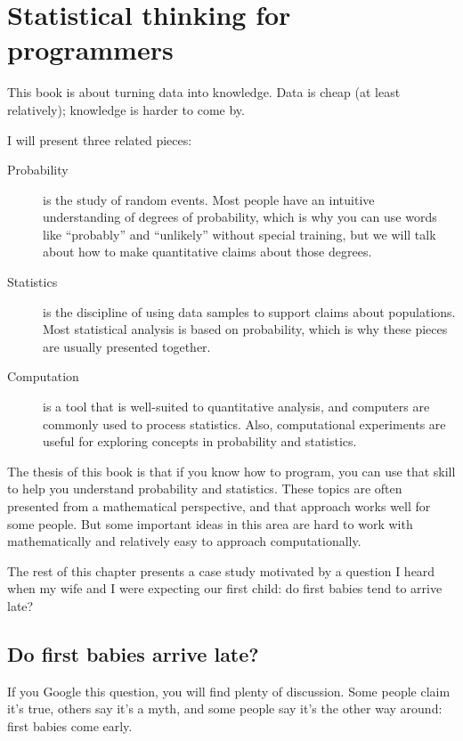\documentclass[12pt]{book}
\begin{document}
\chapter{Statistical thinking for programmers}
\label{intro}

This book is about turning data into knowledge.  Data is cheap (at
least relatively); knowledge is harder to come by.

I will present three related pieces:

\begin{description}

\item[Probability] is the study of random events.  Most people have an
  intuitive understanding of degrees of probability, which is why you
  can use words like ``probably'' and ``unlikely'' without special
  training, but we will talk about how to make quantitative claims
  about those degrees.

\item[Statistics] is the discipline of using data samples to support
  claims about populations.  Most statistical analysis is based on
  probability, which is why these pieces are usually presented
  together.

\item[Computation] is a tool that is well-suited to quantitative
  analysis, and computers are commonly used to process statistics.
  Also, computational experiments
  are useful for exploring concepts in probability and statistics.

\end{description}

The thesis of this book is that if you know how to program, you can
use that skill to help you understand probability and statistics.
These topics are often presented from a mathematical perspective, and
that approach works well for some people.  But some important ideas
in this area are hard to work with mathematically and relatively
easy to approach computationally.

The rest of this chapter presents a case study motivated by a question
I heard when my wife and I were expecting our first child: do first
babies tend to arrive late?

\section{Do first babies arrive late?}

If you Google this question, you will find plenty of discussion.
Some people claim it's true, others say it's a myth, and some people
say it's the other way around: first babies come early.
\end{document}

